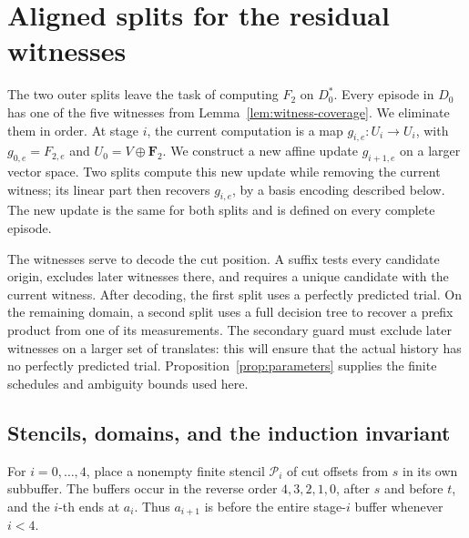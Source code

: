 \section{Aligned splits for the residual witnesses}\label{sec:aligned}

The two outer splits leave the task of computing $F_2$ on $D_0^*$.
Every episode in $D_0$ has one of the five witnesses from
Lemma~\ref{lem:witness-coverage}. We eliminate them in order. At stage $i$,
the current computation is a map $g_{i,e}:U_i\to U_i$, with
$g_{0,e}=F_{2,e}$ and $U_0=V\oplus\mathbf F_2$. We construct a new affine
update $g_{i+1,e}$ on a larger vector space. Two splits compute this new
update while removing the current witness; its linear part then recovers
$g_{i,e}$, by a basis encoding described below. The new update is the
same for both splits and is defined on every complete episode.

The witnesses serve to decode the cut position. A suffix tests every
candidate origin, excludes later witnesses there, and requires a unique
candidate with the current witness. After decoding, the first split uses
a perfectly predicted trial. On the remaining domain, a second split
uses a full decision tree to recover a prefix product from one of its
measurements. The secondary guard must exclude later witnesses on a
larger set of translates: this will ensure that the actual history has
no perfectly predicted trial. Proposition~\ref{prop:parameters} supplies
the finite schedules and ambiguity bounds used here.

\subsection{Stencils, domains, and the induction invariant}

For $i=0,\ldots,4$, place a nonempty finite stencil $\mathcal P_i$ of cut
offsets from $s$ in its own subbuffer. The buffers occur in the reverse
order $4,3,2,1,0$, after $s$ and before $t$, and the $i$-th ends at $a_i$.
Thus $a_{i+1}$ is before the entire stage-$i$ buffer whenever $i<4$.

